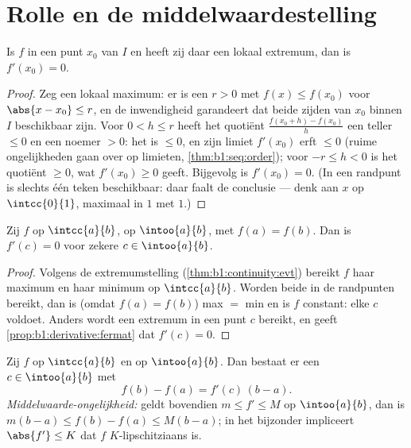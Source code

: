 \section{Rolle en de middelwaardestelling}

\begin{proposition}\label{prop:b1:derivative:fermat}
Is $f$  in een \emph{} punt $x_0$ van $I$ en heeft
zij daar een lokaal extremum, dan is $f'(x_0) = 0$.
\end{proposition}

\begin{proof}
Zeg een lokaal maximum: er is een $r > 0$ met $f(x) \leq f(x_0)$
voor $\abs{x - x_0} \leq r$, en de inwendigheid garandeert dat
beide zijden van $x_0$ binnen $I$ beschikbaar zijn. Voor $0 < h
\leq r$ heeft het quotiënt $\frac{f(x_0 + h) - f(x_0)}{h}$ een
teller $\leq 0$ en een noemer $> 0$: het is $\leq 0$, en zijn
limiet $f'(x_0)$ erft $\leq 0$ (ruime ongelijkheden gaan over op
limieten, \cref{thm:b1:seq:order}); voor $-r \leq h < 0$ is het
quotiënt $\geq 0$, wat $f'(x_0) \geq 0$ geeft. Bijgevolg is
$f'(x_0) = 0$. (In een randpunt is slechts één teken beschikbaar:
daar faalt de conclusie --- denk aan $x$ op $\intcc{0}{1}$,
maximaal in $1$ met  $1$.)
\end{proof}

\begin{theorem}[Rolle]\label{thm:b1:derivative:rolle}
Zij $f$  op $\intcc{a}{b}$,  op $\intoo{a}{b}$, met
$f(a) = f(b)$. Dan is $f'(c) = 0$ voor zekere $c \in
\intoo{a}{b}$.
\end{theorem}

\begin{proof}
Volgens de extremumstelling (\cref{thm:b1:continuity:evt}) bereikt
$f$ haar maximum en haar minimum op $\intcc{a}{b}$. Worden beide in
de randpunten bereikt, dan is (omdat $f(a) = f(b)$) max $=$ min en is
$f$ constant: elke  $c$ voldoet. Anders wordt een extremum
in een  punt $c$ bereikt, en geeft
\cref{prop:b1:derivative:fermat} dat $f'(c) = 0$.
\end{proof}

\begin{theorem}[Middelwaardestelling]\label{thm:b1:derivative:mvt}
Zij $f$  op $\intcc{a}{b}$ en  op $\intoo{a}{b}$.
Dan bestaat er een $c \in \intoo{a}{b}$ met
\[
f(b) - f(a) = f'(c)\,(b - a) .
\]
\emph{Middelwaarde-ongelijkheid:} geldt bovendien $m \leq f' \leq M$
op $\intoo{a}{b}$, dan is $m(b-a) \leq f(b) - f(a) \leq M(b-a)$; in
het bijzonder impliceert $\abs{f'} \leq K$ dat $f$ $K$-lipschitziaans
is.
\end{theorem}

